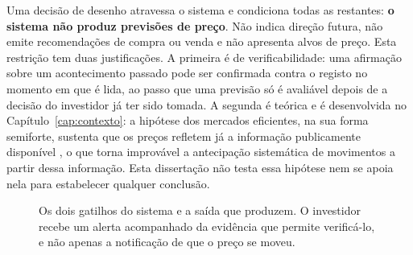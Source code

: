 Uma decisão de desenho atravessa o sistema e condiciona todas as restantes: \textbf{o sistema não
produz previsões de preço}. Não indica direção futura, não emite recomendações de compra ou venda
e não apresenta alvos de preço. Esta restrição tem duas justificações. A primeira é de
verificabilidade: uma afirmação sobre um acontecimento passado pode ser confirmada contra o
registo no momento em que é lida, ao passo que uma previsão só é avaliável depois de a decisão do
investidor já ter sido tomada. A segunda é teórica e é desenvolvida no Capítulo~\ref{cap:contexto}:
a hipótese dos mercados eficientes, na sua forma semiforte, sustenta que os preços refletem já a
informação publicamente disponível \autocite{fama1970efficient}, o que torna improvável a
antecipação sistemática de movimentos a partir dessa informação. Esta dissertação não testa essa
hipótese nem se apoia nela para estabelecer qualquer conclusão.

\begin{figure}[ht]
\centering
{}
\caption[Os dois gatilhos do sistema]{Os dois gatilhos do sistema e a saída que produzem. O
investidor recebe um alerta acompanhado da evidência que permite verificá-lo, e não apenas a
notificação de que o preço se moveu.}
\label{fig:conceito}
\end{figure}

